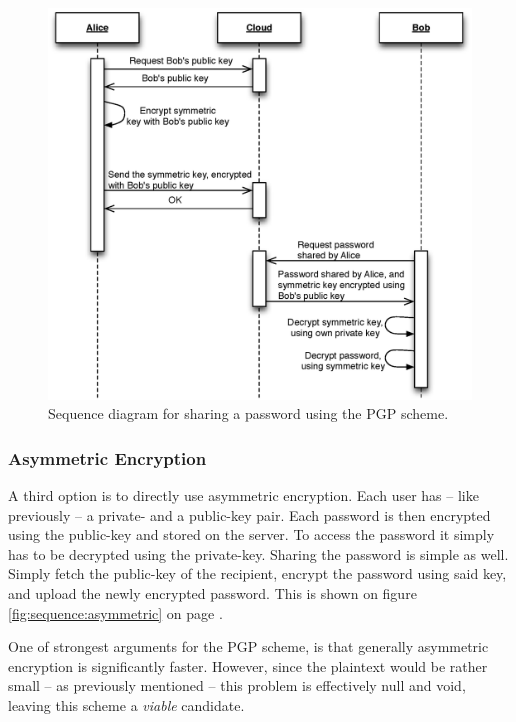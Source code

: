 				\begin{figure}[h!]
					\centering
					\includegraphics[width=\textwidth]{figures/design/uml/sequence/sharing-pgp.eps}
					\caption{Sequence diagram for sharing a password using the PGP scheme.}
					\label{fig:sequence:pgp}
				\end{figure}

			\subsubsection{Asymmetric Encryption}
				\label{sec:assymetric}
				A third option is to directly use asymmetric encryption. Each user has -- like previously -- a private- and a public-key pair. Each password is then encrypted using the public-key and stored on the server. To access the password it simply has to be decrypted using the private-key. Sharing the password is simple as well. Simply fetch the public-key of the recipient, encrypt the password using said key, and upload the newly encrypted password. This is shown on figure \ref{fig:sequence:asymmetric} on page \pageref{fig:sequence:asymmetric}.

				One of strongest arguments for the PGP scheme, is that generally asymmetric encryption is significantly faster. However, since the plaintext would be rather small -- as previously mentioned -- this problem is effectively null and void, leaving this scheme a \emph{viable} candidate.

